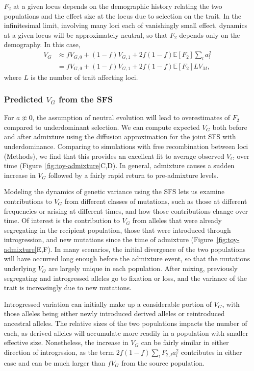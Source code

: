 \documentclass{article}
\begin{document}
$F_2$ at a given locus depends on the demographic history
relating the two populations and the effect size at the locus due to selection
on the trait. In the infinitesimal limit, involving many loci each of
vanishingly small effect, dynamics at a given locus will be approximately
neutral, so that $F_2$ depends only on the demography. In this case,
\begin{align} \label{eq:VG-admixture}
    V_G & \approx f V_{G,0} + (1-f) V_{G,1} + 2f(1-f)\mathbb{E}[F_2] \sum_l a_l^2 \\
    \nonumber
    & = f V_{G,0} + (1-f) V_{G,1} + 2f(1-f)\mathbb{E}[F_2] L V_M,
\end{align}
where $L$ is the number of trait affecting loci.

\subsubsection*{Predicted $V_G$ from the SFS}

For $a \not\approx 0$, the assumption of neutral evolution will lead to
overestimates of $F_2$ compared to underdominant selection. We can compute
expected $V_G$ both before and after admixture using the diffusion
approximation for the joint SFS with underdominance. Comparing to simulations
with free recombination between loci (Methods), we find that this provides an
excellent fit to average observed $V_G$ over time
(Figure~\ref{fig:toy-admixture}C,D). In general, admixture causes a sudden
increase in $V_G$ followed by a fairly rapid return to pre-admixture levels.

Modeling the dynamics of genetic variance using the SFS lets us examine
contributions to $V_G$ from different classes of mutations, such as those at
different frequencies or arising at different times, and how those
contributions change over time. Of interest is the contribution to $V_G$ from
alleles that were already segregating in the recipient population, those that
were introduced through introgression, and new mutations since the time of
admixture (Figure~\ref{fig:toy-admixture}E,F). In many scenarios, the initial
divergence of the two populations will have occurred long enough before the
admixture event, so that the mutations underlying $V_G$ are largely unique in
each population. After mixing, previously segregating and introgressed alleles
go to fixation or loss, and the variance of the trait is increasingly due to
new mutations. 

Introgressed variation can initially make up a considerable portion of $V_G$,
with those alleles being either newly introduced derived alleles or
reintroduced ancestral alleles. The relative sizes of the two populations
impacts the number of each, as derived alleles will accumulate more readily in
a population with smaller effective size. Nonetheless, the increase in $V_G$
can be fairly similar in either direction of introgrssion, as the term
\(2f(1-f)\sum_l F_{2,l} a_l^2\) contributes in either case and can be much
larger than $f V_G$ from the source population.
\end{document}

